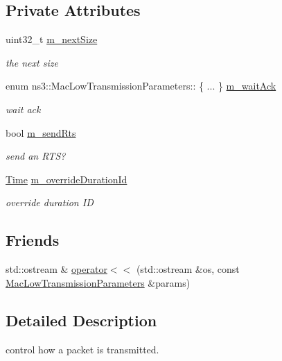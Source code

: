 \subsection*{Private Attributes}
\begin{DoxyCompactItemize}
\item 
uint32\+\_\+t \hyperlink{classns3_1_1MacLowTransmissionParameters_af7cab47db1efae8fab586a9648dd91e5}{m\+\_\+next\+Size}
\begin{DoxyCompactList}\small\item\em the next size \end{DoxyCompactList}\item 
enum ns3\+::\+Mac\+Low\+Transmission\+Parameters\+:: \{ ... \}  \hyperlink{classns3_1_1MacLowTransmissionParameters_af692d98f721d394f65d3b5df1dc41859}{m\+\_\+wait\+Ack}
\begin{DoxyCompactList}\small\item\em wait ack \end{DoxyCompactList}\item 
bool \hyperlink{classns3_1_1MacLowTransmissionParameters_a10fe893345e02d862c67f0dffb8c0cde}{m\+\_\+send\+Rts}
\begin{DoxyCompactList}\small\item\em send an R\+TS? \end{DoxyCompactList}\item 
\hyperlink{classns3_1_1Time}{Time} \hyperlink{classns3_1_1MacLowTransmissionParameters_a3a32671d645f4f25ed58e142f8554dcf}{m\+\_\+override\+Duration\+Id}
\begin{DoxyCompactList}\small\item\em override duration ID \end{DoxyCompactList}\end{DoxyCompactItemize}
\subsection*{Friends}
\begin{DoxyCompactItemize}
\item 
std\+::ostream \& \hyperlink{classns3_1_1MacLowTransmissionParameters_a470f0d607517af3112ea9ea598997a93}{operator$<$$<$} (std\+::ostream \&os, const \hyperlink{classns3_1_1MacLowTransmissionParameters}{Mac\+Low\+Transmission\+Parameters} \&params)
\end{DoxyCompactItemize}


\subsection{Detailed Description}
control how a packet is transmitted.

